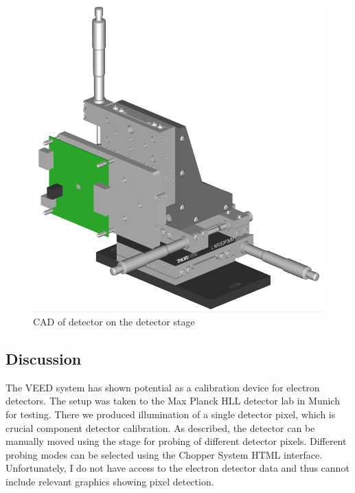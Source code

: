 \documentclass{article}
\begin{document}
    \begin{figure}[h]
        \centering
        \includegraphics[scale=0.4]{img/calibration_cad}
        \caption{CAD of detector on the detector stage}
        \label{fig:calibration_cad}
    \end{figure}
    
    \subsection{Discussion}
    
    The VEED system has shown potential as a calibration device for electron detectors. The setup was taken to the Max Planck HLL detector lab in Munich for testing. There we produced illumination of a single detector pixel, which is crucial component detector calibration. As described, the detector can be manually moved using the stage for probing of different detector pixels. Different probing modes can be selected using the Chopper System HTML interface. Unfortunately, I do not have access to the electron detector data and thus cannot include relevant graphics showing pixel detection.
    
\end{document}
